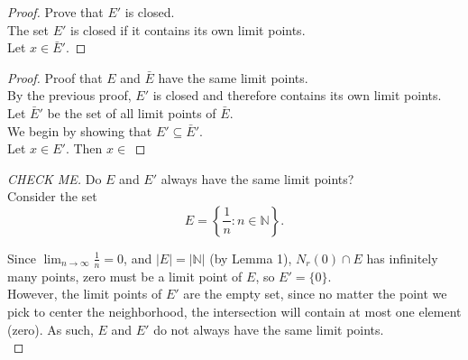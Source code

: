 \documentclass[10pt]{article}
\theoremstyle{definition}
\theoremstyle{plain}
\newcommand{\N}{\mathbb{N}}
\begin{document}
\begin{proof}
Prove that $E'$ is closed. \\

The set $E'$ is closed if it contains its own limit points. \\

Let $x\in \bar{E}'$.




\end{proof}

\begin{proof}
Proof that $E$ and $\bar{E}$ have the same limit points. \\

By the previous proof, $E'$ is closed and therefore contains its own limit points. \\

Let $\bar{E}'$ be the set of all limit points of $\bar{E}$. \\

We begin by showing that $E'\subseteq \bar{E}'$. \\

Let $x\in E'$. Then $x\in  $

\end{proof}

\begin{proof}[CHECK ME]
  Do $E$ and $E'$ always have the same limit points? \\

  Consider the set
  $$E = \left\{\frac{1}{n}: n\in\N\right\}.$$

  Since $\lim_{n\rightarrow\infty} \frac{1}{n} = 0$, and $|E|=|\N|$ (by Lemma 1), $N_r (0)\cap E$ has infinitely many points, zero must be a limit point of $E$, so $E' = \{0\}$. \\
  
  However, the limit points of $E'$ are the empty set, since no matter the point we pick to center the neighborhood, the intersection will contain at most one element (zero). As such, $E$ and $E'$ do not always have the same limit points. \\
\end{proof}
\end{document}
